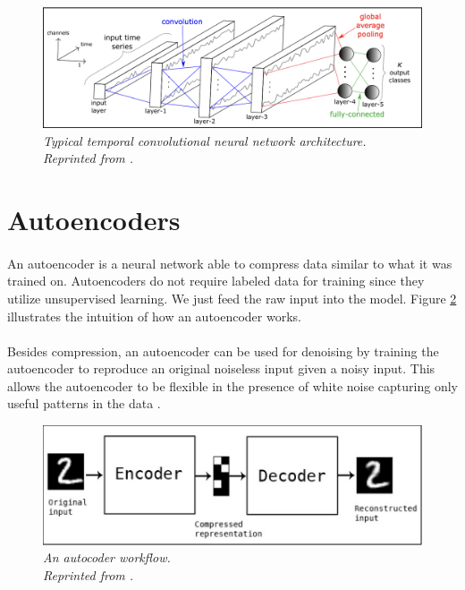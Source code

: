 \begin{figure}[H]
  \centering
  \caption[Typical temporal convolutional neural network architecture.]{\emph{Typical temporal convolutional neural network architecture.  \\
  Reprinted from \citeauthor{ismail_fawaz_forestier_weber_idoumghar_muller_2019} \citeyear{ismail_fawaz_forestier_weber_idoumghar_muller_2019}.}}\label{fig:CNN_ts}
  \includegraphics[scale = 0.3]{figures/CNN_ts.jpg}  
\end{figure}



\section{Autoencoders}
\paragraph{}
An autoencoder is a neural network able to compress data similar to what it was trained on. Autoencoders do not require labeled data for training since they utilize unsupervised learning. We just feed the raw input into the model. Figure \ref{fig:ae} illustrates the intuition of how an autoencoder works. 

\paragraph{}
Besides compression, an autoencoder can be used for denoising by training the autoencoder to reproduce an original noiseless input given a noisy input. This allows the autoencoder to be flexible in the presence of white noise capturing only useful patterns in the data \cite{vincent10a}.

\begin{figure}[H]
  \centering
  \caption[An autocoder workflow.]{\emph{An autocoder workflow. \\
  Reprinted from \citeauthor{chollet_2016} \citeyear{chollet_2016}.}}\label{fig:ae}
  \includegraphics[scale = 0.5]{figures/ae.jpg}  
\end{figure}

